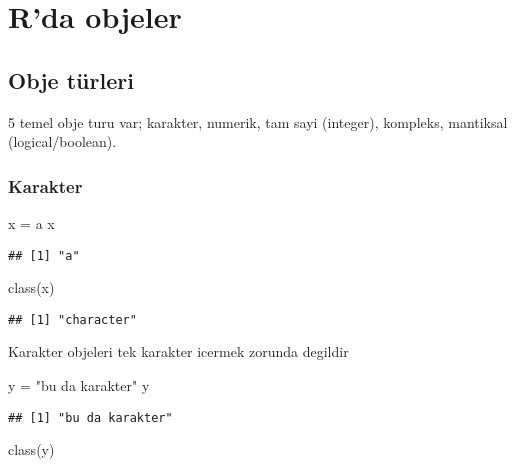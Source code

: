 \documentclass[
]{book}
\newenvironment{Shaded}{\begin{snugshade}}{\end{snugshade}}
\newcommand{\FunctionTok}[1]{\textcolor[rgb]{0.00,0.00,0.00}{#1}}
\newcommand{\NormalTok}[1]{#1}
\newcommand{\OtherTok}[1]{\textcolor[rgb]{0.56,0.35,0.01}{#1}}
\newcommand{\StringTok}[1]{\textcolor[rgb]{0.31,0.60,0.02}{#1}}
\begin{document}
\hypertarget{rda-objeler}{%
\section{R'da objeler}\label{rda-objeler}}

\hypertarget{obje-tuxfcrleri}{%
\subsection{Obje türleri}\label{obje-tuxfcrleri}}

5 temel obje turu var; karakter, numerik, tam sayi (integer), kompleks, mantiksal (logical/boolean).

\hypertarget{karakter}{%
\subsubsection{Karakter}\label{karakter}}

\begin{Shaded}
\begin{Highlighting}[]
\NormalTok{x }\OtherTok{=} \StringTok{\textquotesingle{}a\textquotesingle{}}
\NormalTok{x}
\end{Highlighting}
\end{Shaded}

\begin{verbatim}
## [1] "a"
\end{verbatim}

\begin{Shaded}
\begin{Highlighting}[]
\FunctionTok{class}\NormalTok{(x)}
\end{Highlighting}
\end{Shaded}

\begin{verbatim}
## [1] "character"
\end{verbatim}

Karakter objeleri tek karakter icermek zorunda degildir

\begin{Shaded}
\begin{Highlighting}[]
\NormalTok{y }\OtherTok{=} \StringTok{"bu da karakter"}
\NormalTok{y}
\end{Highlighting}
\end{Shaded}

\begin{verbatim}
## [1] "bu da karakter"
\end{verbatim}

\begin{Shaded}
\begin{Highlighting}[]
\FunctionTok{class}\NormalTok{(y)}
\end{Highlighting}
\end{Shaded}
\end{document}
